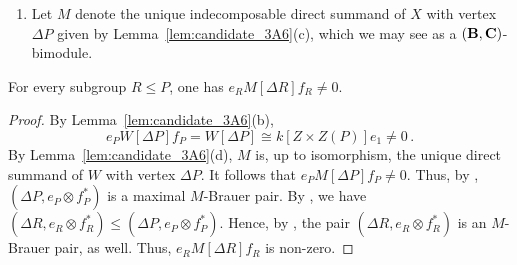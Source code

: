 \begin{nota}\label{nota:BimodulesSection_3A6}\leavevmode
\begin{enumerate}[label=(\arabic*),start=18]
    \item\label{nota:DefBimodule-3A6} 
    Let $M$ denote the unique indecomposable direct summand of $X$ with vertex $\Delta P$ given by  Lemma~\ref{lem:candidate_3A6}(c), which we may see as a $({\mathbf{B}},{\mathbf{C}})$-bimodule.  
\end{enumerate}    
\end{nota}

\begin{lem}\label{lem:non-vanishing-local-M}
    For every subgroup $R\le P$, one has $e_RM[\Delta R]f_R\neq 0$.
\end{lem}
\begin{proof}
    By Lemma~\ref{lem:candidate_3A6}(b),
    \[
    e_PW[\Delta P]f_P=W[\Delta P]\cong k[Z\times Z(P)]e_1\neq 0\,.
    \]
    By Lemma~\ref{lem:candidate_3A6}(d), $M$ is, up to isomorphism, the unique direct summand of $W$ with vertex $\Delta P$. It follows that $e_PM[\Delta P]f_P\neq 0$. Thus, by \cite[Proposition~5.3(c)]{BoltjePerepelitsky}, $(\Delta P, e_P\otimes f_P^*)$ is a maximal $M$-Brauer pair. By \cite[Remark~10.2(c)]{BoltjePerepelitsky}, we have $(\Delta R, e_R\otimes f_R^*)\le (\Delta P,e_P\otimes f_P^*)$. Hence, by \cite[Proposition~5.3(b)]{BoltjePerepelitsky}, the pair $(\Delta R, e_R\otimes f_R^*)$ is an $M$-Brauer pair, as well. Thus, $e_RM[\Delta R]f_R$ is non-zero.
\end{proof}

